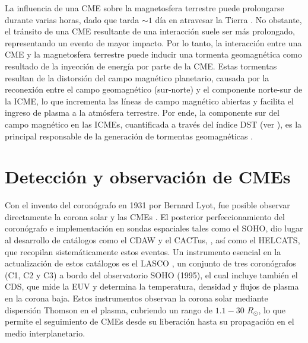 La influencia de una \ac{CME} sobre la magnetosfera terrestre puede prolongarse durante varias horas, dado que tarda $\sim1$ día en atravesar la Tierra \parencite[e.g.,][]{lugaz-2017}. No obstante, el tránsito de una \ac{CME} resultante de una interacción suele ser más prolongado, representando un evento de mayor impacto. Por lo tanto, la interacción entre una \ac{CME} y la magnetosfera terrestre puede inducir una tormenta geomagnética como resultado de la inyección de energía por parte de la \ac{CME}. Estas tormentas resultan de la distorsión del campo magnético planetario, causada por la reconexión entre el campo geomagnético (sur-norte) y el componente norte-sur de la \ac{ICME}, lo que incrementa las líneas de campo magnético abiertas y facilita el ingreso de plasma a la atmósfera terrestre. Por ende, la componente sur del campo magnético en las \acp{ICME}, cuantificada a través del índice \ac{DST} (ver \pageref{DST}), es la principal responsable de la generación de tormentas geomagnéticas \parencite[e.g.,][]{wilson-1987, 2014swcm.book.....H}.

\section{Detección y observación de CMEs}

Con el invento del coronógrafo en 1931 por Bernard Lyot, fue posible observar directamente la corona solar y las \acp{CME} \parencite[e.g.,][]{hansen-1971, tousey1973solar, 2014swcm.book.....H, FotógrafiaCME-2021, 1879MmRAS..41..483.}. El posterior perfeccionamiento del coronógrafo e implementación en sondas espaciales tales como el \ac{SOHO}, dio lugar al desarrollo de catálogos como el \ac{CDAW} y el \ac{CACTus}, \parencite[e.g.,][]{yashiro-2008, yashiro-2004}, así como el \ac{HELCATS}, que recopilan sistemáticamente estos eventos. Un instrumento esencial en la actualización de estos catálogos es el \ac{LASCO} \parencite[e.g.,][]{domingo-1995}, un conjunto de tres coronógrafos (C1, C2 y C3) a bordo del observatorio \ac{SOHO} (1995), el cual incluye también el \ac{CDS}, que mide la \ac{EUV} y determina la temperatura, densidad y flujos de plasma en la corona baja. Estos instrumentos observan la corona solar mediante dispersión Thomson en el plasma, cubriendo un rango de $1.1-30$ $R_{\odot}$, lo que permite el seguimiento de \acp{CME} desde su liberación hasta su propagación en el medio interplanetario. 

